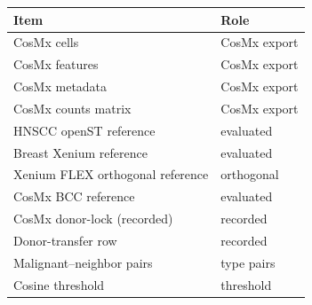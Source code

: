 \begin{tabular}{ll}
\toprule
Item & Role \\
\midrule
CosMx cells & CosMx export \\
CosMx features & CosMx export \\
CosMx metadata & CosMx export \\
CosMx counts matrix & CosMx export \\
HNSCC openST reference & evaluated \\
Breast Xenium reference & evaluated \\
Xenium FLEX orthogonal reference & orthogonal \\
CosMx BCC reference & evaluated \\
CosMx donor-lock (recorded) & recorded \\
Donor-transfer row & recorded \\
Malignant--neighbor pairs & type pairs \\
Cosine threshold & threshold \\
\bottomrule
\end{tabular}
